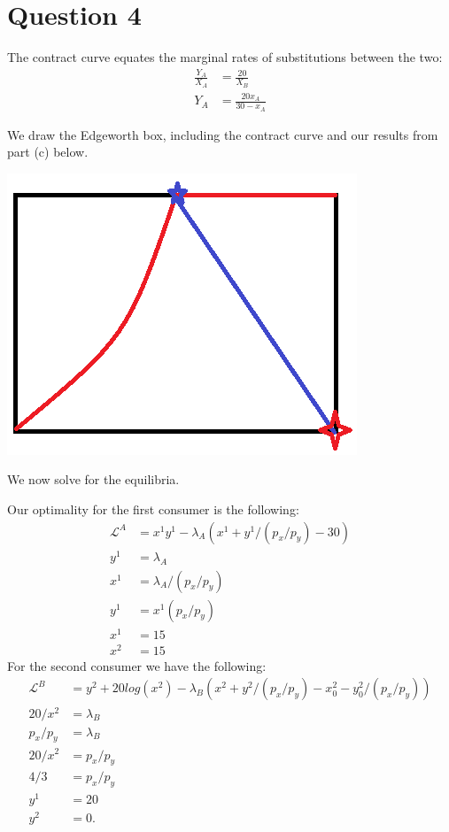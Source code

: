 \documentclass[11pt]{article} %
\begin{document}
\section{Question 4}
The contract curve equates the marginal rates of substitutions between the two:
\begin{align*}
\frac{Y_A}{X_A} &= \frac{20 }{X_B}\\
Y_A &= \frac{20 x_A}{30 - x_A}
\end{align*}

We draw the Edgeworth box, including the contract curve and our results from part (c) below.

\includegraphics{edgeworth2}

We now solve for the equilibria.

Our optimality for the first consumer is the following:
\begin{align*}
\mathcal{L}^A &= x^1y^1 - \lambda_A(x^1+ y^1/(p_x/p_y) -30 )\\
y^1 &= \lambda_A\\
x^1 &= \lambda_A/(p_x/p_y)\\
y^1 &= x^1 (p_x/p_y)\\
x^1 &= 15 \\
x^2 &= 15
\end{align*}
For the second consumer we have the following:
\begin{align*}
\mathcal{L}^B &= y^2 + 20log(x^2) - \lambda_B(x^2+ y^2/(p_x/p_y) - x_0^2 - y_0^2/(p_x/p_y))\\
20/x^2 &= \lambda_B \\
p_x/p_y &= \lambda_B\\
20/x^2 &= p_x/p_y  \\
4/3 &= p_x/p_y \\
y^1 &= 20\\
y^2 &= 0.
\end{align*}
\end{document}
